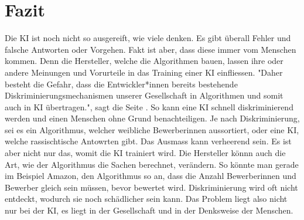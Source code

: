 \documentclass{article}
\begin{document}
\section{Fazit}
Die KI ist noch nicht so ausgereift, wie viele denken. Es gibt überall Fehler und falsche Antworten oder Vorgehen. Fakt ist aber, dass diese immer vom Menschen kommen. Denn die Hersteller, welche die Algorithmen bauen, lassen ihre oder andere Meinungen und Vorurteile in das Training einer KI einfliessen. "Daher besteht die Gefahr, dass die Entwickler*innen bereits bestehende Diskriminierungsmechanismen unserer Gesellschaft in Algorithmen und somit auch in KI übertragen.", sagt die Seite \citep{Digitalisierung}. So kann eine KI schnell diskriminierend werden und einen Menschen ohne Grund benachteiligen. Je nach Diskriminierung, sei es ein Algorithmus, welcher weibliche Bewerberinnen aussortiert, oder eine KI, welche rassischtische Antowrten gibt. Das Ausmass kann verheerend sein. Es ist aber nicht nur das, womit die KI trainiert wird. Die Hersteller könnn auch die Art, wie der Algorithmus die Sachen berechnet, verändern. So könnte man gerade im Beispiel Amazon, den Algorithmus so an, dass die Anzahl Bewerberinnen und Bewerber gleich sein müssen, bevor bewertet wird. Diskriminierung wird oft nicht entdeckt, wodurch sie noch schädlicher sein kann. Das Problem liegt also nicht nur bei der KI, es liegt in der Gesellschaft und in der Denksweise der Menschen. 

\notice{*}

\printbibliography
\end{document}
